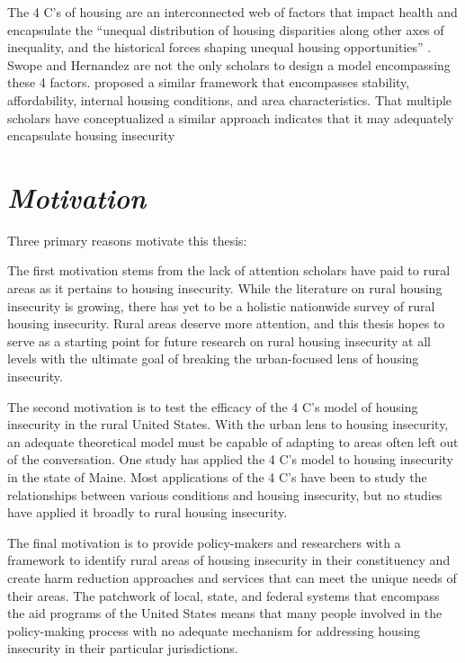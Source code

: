 The 4 C’s of housing are an interconnected web of factors that impact health and encapsulate the “unequal distribution of housing disparities along other axes of inequality, and the historical forces shaping unequal housing opportunities” \citep[1]{hernandez_housing_2019}.  Swope and Hernandez are not the only scholars to design a model encompassing these 4 factors. \citet{metzger_fair_2017} proposed a similar framework that encompasses stability, affordability, internal housing conditions, and area characteristics. That multiple scholars have conceptualized a similar approach indicates that it may adequately encapsulate housing insecurity

\section{\textit{Motivation}}
Three primary reasons motivate this thesis:

The first motivation stems from the lack of attention scholars have paid to rural areas as it pertains to housing insecurity. While the literature on rural housing insecurity is growing, there has yet to be a holistic nationwide survey of rural housing insecurity. Rural areas deserve more attention, and this thesis hopes to serve as a starting point for future research on rural housing insecurity at all levels with the ultimate goal of breaking the urban-focused lens of housing insecurity.

The second motivation is to test the efficacy of the 4 C's model of housing insecurity in the rural United States. With the urban lens to housing insecurity, an adequate theoretical model must be capable of adapting to areas often left out of the conversation. One study \citep{gleason_using_2021} has applied the 4 C's model to housing insecurity in the state of Maine. Most applications of the 4 C's have been to study the relationships between various conditions and housing insecurity, but no studies have applied it broadly to rural housing insecurity.

The final motivation is to provide policy-makers and researchers with a framework to identify rural areas of housing insecurity in their constituency and create harm reduction approaches and services that can meet the unique needs of their areas. The patchwork of local, state, and federal systems that encompass the aid programs of the United States means that many people involved in the policy-making process with no adequate mechanism for addressing housing insecurity in their particular jurisdictions.

